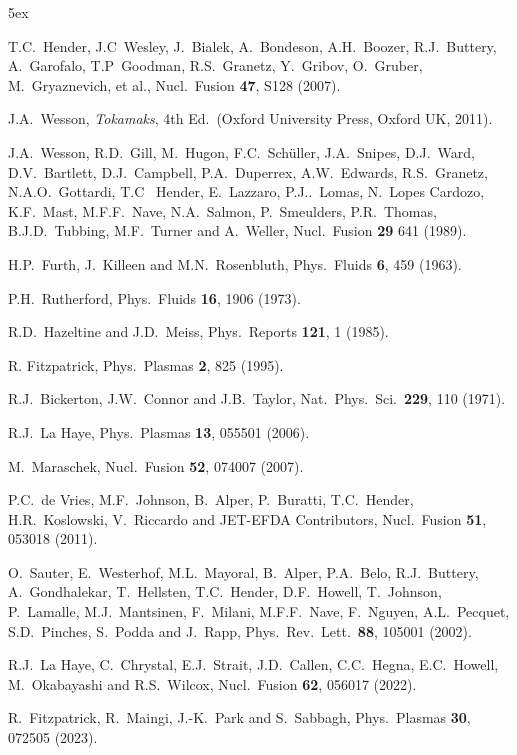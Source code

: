\documentclass[12pt,prb,aps]{revtex4-1}
\begin{document}
\begin{thebibliography}{99}\baselineskip 5ex

 T.C.~Hender, J.C~Wesley, J.~Bialek, A.~Bondeson, A.H.~Boozer, R.J.~Buttery, A.~Garofalo, T.P~Goodman, R.S.~Granetz, Y.~Gribov, O.~Gruber, 
M.~Gryaznevich, et al., Nucl.\  Fusion {\bf 47}, S128 (2007).

 J.A.~Wesson, {\em Tokamaks}, 4th Ed.\ (Oxford University Press, Oxford UK, 2011).

 J.A.~Wesson, R.D.~Gill, M.~Hugon, F.C.~Sch\"{u}ller, J.A.~Snipes, D.J.~Ward, D.V.~Bartlett, D.J.~Campbell, P.A.~Duperrex, A.W.~Edwards, 
R.S.~Granetz, N.A.O.~Gottardi, T.C~ Hender, E.~Lazzaro, P.J..~Lomas, N.~Lopes Cardozo, K.F.~Mast, M.F.F.~Nave, N.A.~Salmon, P.~Smeulders, 
P.R.~Thomas, B.J.D.~Tubbing, M.F.~Turner and A.~Weller, Nucl.\ Fusion {\bf 29} 641 (1989). 

 H.P.~Furth,  J.~Killeen and M.N.~Rosenbluth,  Phys.\ Fluids {\bf 6}, 459 (1963).

 P.H.~Rutherford, Phys.\ Fluids {\bf 16}, 1906 (1973).

 R.D.~Hazeltine and J.D.~Meiss, Phys.\ Reports {\bf 121}, 1 (1985).

 R. Fitzpatrick, Phys.\ Plasmas {\bf 2}, 825 (1995).

 R.J.~Bickerton, J.W.~Connor and J.B.~Taylor, Nat.\ Phys.\ Sci.\ {\bf 229}, 110 (1971). 

 R.J.~La Haye, Phys.\ Plasmas {\bf 13}, 055501 (2006).

 M.~Maraschek, Nucl.\ Fusion {\bf 52}, 074007 (2007). 

 P.C.~de Vries, M.F.~Johnson, B.~Alper, P.~Buratti, T.C.~Hender, H.R.~Koslowski, V.~Riccardo and JET-EFDA Contributors,  Nucl.\ Fusion {\bf 51},  053018 (2011).

 O.~Sauter, E.~Westerhof, M.L.~Mayoral, B.~Alper, P.A.~Belo, R.J.~Buttery, A.~Gondhalekar, T.~Hellsten, T.C.~Hender, 
D.F.~Howell, T.~Johnson, P.~Lamalle, M.J.~Mantsinen, F.~Milani, M.F.F.~Nave, F.~Nguyen, A.L.~Pecquet, S.D.~Pinches, S.~Podda and J.~Rapp,
Phys.\ Rev.\ Lett.\ {\bf 88}, 105001 (2002).

 R.J.~La Haye, C.~Chrystal, E.J.~Strait, J.D.~Callen, C.C.~Hegna, E.C.~Howell, M.~Okabayashi and R.S.~Wilcox, Nucl.\ Fusion {\bf 62}, 056017 (2022).

  R.~Fitzpatrick, R.~Maingi, J.-K.~Park and S.~Sabbagh, Phys.\ Plasmas {\bf 30}, 072505 (2023).


\end{thebibliography}
\end{document}
